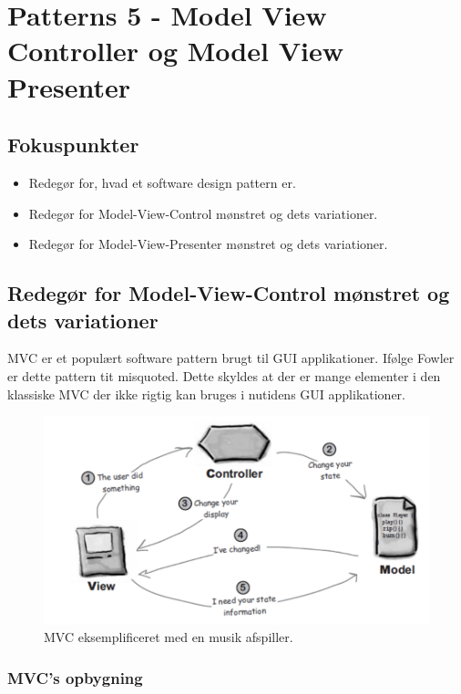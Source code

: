 \section{Patterns 5 - Model View Controller og Model View Presenter}

\subsection{Fokuspunkter}

\begin{itemize}
	\item Redegør for, hvad et software design pattern er.
	\item Redegør for Model-View-Control mønstret og dets variationer.
	\item Redegør for Model-View-Presenter mønstret og dets variationer.
\end{itemize}



\subsection{Redegør for Model-View-Control mønstret og dets variationer}
MVC er et populært software pattern brugt til GUI applikationer. Ifølge Fowler er dette pattern tit misquoted. Dette skyldes at der er mange elementer i den klassiske MVC der ikke rigtig kan bruges i nutidens GUI applikationer.

\begin{figure}[H]
	\centering
	\includegraphics[width=0.8\linewidth]{figs/mvcExample}
	\caption{MVC eksemplificeret med en musik afspiller.}
	\label{fig:mvcExample}
\end{figure}

\subsubsection{MVC's opbygning}

